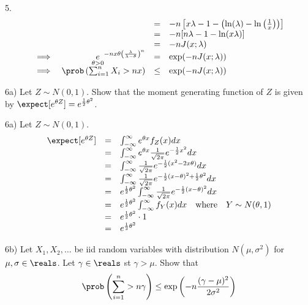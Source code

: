 \documentclass[11pt,a4paper]{article}
\begin{document}
\begin{answer}{5.}
\[\begin{array}{rrcl}
    &&=&-n\left[x\lambda-1-\left(\ln(\lambda)-\ln\left(\frac1x\right)\right)\right]\\
    &&=&-n[n\lambda-1-\ln(x\lambda)]\\
    &&=&-nJ(x;\lambda)\\
    \implies&\underset{\theta>0}e^{-nx\theta\left(\frac\lambda{\lambda-\theta}\right)^n}&=&\exp(-nJ(x;\lambda))\\
    \implies&\prob\left(\sum_{i=1}^nX_i>nx\right)&\leq&\exp(-nJ(x;\lambda))
  \end{array}\]
\end{answer}

\begin{question}{6a)}
  Let $Z\sim N(0,1)$. Show that the moment generating function of $Z$ is given by $\expect[e^{\theta Z}]=e^{\frac12\theta^2}$.
\end{question}

\begin{answer}{6a)}
  Let $Z\sim N(0,1)$.
  \[\begin{array}{rcl}
    \expect[e^{\theta Z}]&=&\int_{-\infty}^\infty e^{\theta x}f_Z(x)dx\\
    &=&\int_{-\infty}^\infty e^{\theta x}\frac1{\sqrt{2\pi}}e^{-\frac12x^2}dx\\
    &=&\int_{-\infty}^\infty \frac1{\sqrt{2\pi}}e^{-\frac12(x^2-2x\theta)}dx\\
    &=&\int_{-\infty}^\infty \frac1{\sqrt{2\pi}}e^{-\frac12(x-\theta)^2+\frac12\theta^2}dx\\
    &=& e^{\frac12\theta^2}\int_{-\infty}^\infty \frac1{\sqrt{2\pi}}e^{-\frac12(x-\theta)^2}dx\\
    &=& e^{\frac12\theta^2}\int_{-\infty}^\infty f_Y(x)dx\quad\text{where}\quad Y\sim N(\theta,1)\\
    &=& e^{\frac12\theta^2}\cdot1\\
    &=& e^{\frac12\theta^2}
  \end{array}\]
\end{answer}

\begin{question}{6b)}
  Let $X_1,X_2,\dots$ be iid random variables with distribution $N(\mu,\sigma^2)$ for $\mu,\sigma\in\reals$. Let $\gamma\in\reals$ st $\gamma>\mu$. Show that
  \[ \prob\left(\sum_{i=1}^n>n\gamma\right)\leq\exp\left(-n\frac{(\gamma-\mu)^2}{2\sigma^2}\right) \]
\end{question}
\end{document}
